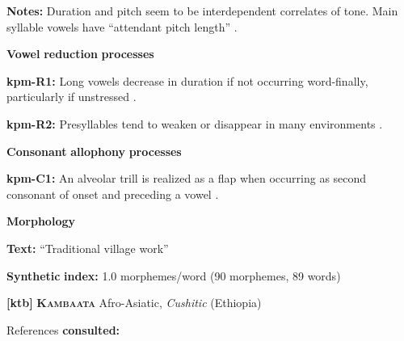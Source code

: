 \begin{styleBody}
\textbf{Notes:} Duration and pitch seem to be interdependent correlates of tone. Main syllable vowels have “attendant pitch length” \citep[32]{Olsen2014}.
\end{styleBody}

\begin{styleBody}
\textbf{Vowel} \textbf{reduction} \textbf{processes}
\end{styleBody}

\begin{styleBody}
\textbf{kpm-R1:}  Long vowels decrease in duration if not occurring word-finally, particularly if unstressed \citep[33]{Olsen2014}.
\end{styleBody}

\begin{styleBody}
\textbf{kpm-R2:} Presyllables tend to weaken or disappear in many environments \citep[31]{Olsen2014}.
\end{styleBody}

\begin{styleBody}
\textbf{Consonant} \textbf{allophony} \textbf{processes}
\end{styleBody}

\begin{styleBody}
\textbf{kpm-C1:} An alveolar trill is realized as a flap when occurring as second consonant of onset and preceding a vowel \citep[24]{Olsen2014}.
\end{styleBody}

\begin{styleBody}
\textbf{Morphology}
\end{styleBody}

\begin{styleBody}
\textbf{Text:} “Traditional village work” \citep[106-107]{Olsen2014}
\end{styleBody}

\begin{styleBody}
\textbf{Synthetic} \textbf{index:} 1.0 morphemes/word (90 morphemes, 89 words)
\end{styleBody}

\begin{styleBody}
\textbf{[ktb]}   \textbf{\textsc{Kambaata}}  Afro-Asiatic, \textit{Cushitic} (Ethiopia)
\end{styleBody}

\begin{styleBody}
References \textbf{consulted:} \citet{Treis2008}
\end{styleBody}

